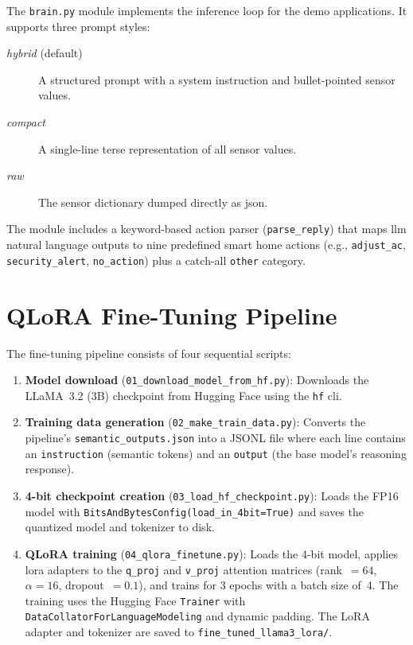 \documentclass[12pt,a4paper,oneside]{report}
\begin{document}
The \texttt{brain.py} module implements the inference loop for the demo applications. It supports three prompt styles:

\begin{description}
    \item[\textit{hybrid} (default)] A structured prompt with a system instruction and bullet-pointed sensor values.
    \item[\textit{compact}] A single-line terse representation of all sensor values.
    \item[\textit{raw}] The sensor dictionary dumped directly as \gls{json}.
\end{description}

The module includes a keyword-based action parser (\texttt{parse\_reply}) that maps \gls{llm} natural language outputs to nine predefined smart home actions (e.g., \texttt{adjust\_ac}, \texttt{security\_alert}, \texttt{no\_action}) plus a catch-all \texttt{other} category.


\section{QLoRA Fine-Tuning Pipeline}
\label{sec:impl-qlora}

The fine-tuning pipeline consists of four sequential scripts:

\begin{enumerate}
    \item \textbf{Model download} (\texttt{01\_download\_model\_from\_hf.py}): Downloads the LLaMA~3.2 (3B) checkpoint from Hugging Face using the \texttt{hf} \gls{cli}.

    \item \textbf{Training data generation} (\texttt{02\_make\_train\_data.py}): Converts the pipeline's \texttt{semantic\_outputs.json} into a JSONL file where each line contains an \texttt{instruction} (semantic tokens) and an \texttt{output} (the base model's reasoning response).

    \item \textbf{4-bit checkpoint creation} (\texttt{03\_load\_hf\_checkpoint.py}): Loads the FP16 model with \texttt{BitsAndBytesConfig(load\_in\_4bit=True)} and saves the quantized model and tokenizer to disk.

    \item \textbf{QLoRA training} (\texttt{04\_qlora\_finetune.py}): Loads the 4-bit model, applies \gls{lora} adapters to the \texttt{q\_proj} and \texttt{v\_proj} attention matrices (rank~$=64$, $\alpha=16$, dropout~$=0.1$), and trains for 3 epochs with a batch size of~4. The training uses the Hugging Face \texttt{Trainer} with \texttt{DataCollatorForLanguageModeling} and dynamic padding. The LoRA adapter and tokenizer are saved to \texttt{fine\_tuned\_llama3\_lora/}.
\end{enumerate}
\end{document}
